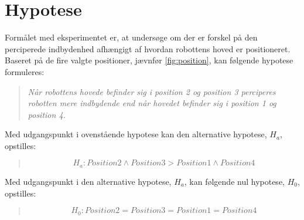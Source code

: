 \section*{Hypotese}
\label{Hypotese}
%
Formålet med eksperimentet er, at undersøge om der er forskel på den perciperede indbydenhed afhængigt af hvordan robottens hoved er positioneret. Baseret på de fire valgte positioner, jævnfør \autoref{fig:position}, kan følgende hypotese formuleres: 
%
\begin{quotation}
\noindent
  \textit{Når robottens hovede befinder sig i position 2 og position 3 perciperes robotten mere indbydende end når hovedet befinder sig i position 1 og position 4.}
\end{quotation}
\noindent
%
Med udgangspunkt i ovenstående hypotese kan den alternative hypotese, $H_a$, opstilles:
%
\begin{quotation}
\noindent
\begin{equation}
  H_a: Position 2 \wedge Position 3 > Position 1 \wedge Position 4
\end{equation}  
\end{quotation}
\noindent
%
Med udgangspunkt i den alternative hypotese, $H_a$, kan følgende nul hypotese, $H_0$, opstilles: 
%
%
\begin{quotation}
\noindent
\begin{equation}
  H_0: Position 2 = Position 3 = Position 1 = Position 4
\end{equation}  
\end{quotation}
\noindent
%
